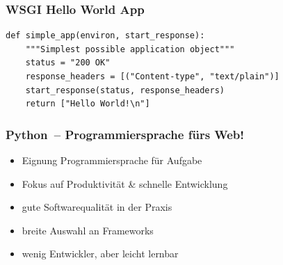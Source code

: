 \documentclass[
    t,
    smaller,
    compress,
    xcolor=svgnames,            %
    table,
]{beamer}
\begin{document}
\begin{frame}[fragile]
  \frametitle{WSGI Hello World App}

  \begin{lstlisting}
def simple_app(environ, start_response):
    """Simplest possible application object"""
    status = "200 OK"
    response_headers = [("Content-type", "text/plain")]
    start_response(status, response_headers)
    return ["Hello World!\n"]
  \end{lstlisting}
\end{frame}


\begin{frame}
  \frametitle{Python~-- Programmiersprache fürs Web!}

  \begin{itemize}[<1->]
    \item Eignung Programmiersprache für Aufgabe
    \item Fokus auf Produktivität \& schnelle Entwicklung
    \item gute Softwarequalität in der Praxis
    \item breite Auswahl an Frameworks
    \item wenig Entwickler, aber leicht lernbar
  \end{itemize}

\end{frame}
\end{document}
